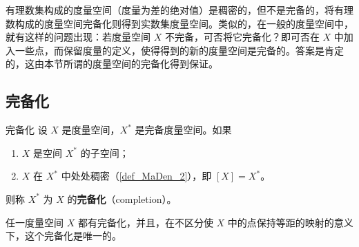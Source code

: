 
有理数集构成的度量空间（度量为差的绝对值）是稠密的，但不是完备的，将有理数构成的度量空间完备化则得到实数集度量空间。类似的，在一般的度量空间中，就有这样的问题出现：若度量空间 $X$ 不完备，可否将它完备化？即可否在 $X$ 中加入一些点，而保留度量的定义，使得得到的新的度量空间是完备的。答案是肯定的，这由本节所谓的度量空间的完备化得到保证。

\subsection{完备化}
\begin{definition}{完备化}
设 $X$ 是度量空间，$X^*$ 是完备度量空间。如果
\begin{enumerate}
\item $X$ 是空间 $X^*$ 的子空间；
\item $X$ 在 $X^*$ 中处处稠密（\autoref{def_MaDen_2}），即 $[X]=X^*$。
\end{enumerate}
则称 $X^*$ 为 $X$ 的\textbf{完备化}（completion）。
\end{definition}

\begin{theorem}{}
任一度量空间 $X$ 都有完备化，并且，在不区分使 $X$ 中的点保持等距的映射的意义下，这个完备化是唯一的。
\end{theorem}



